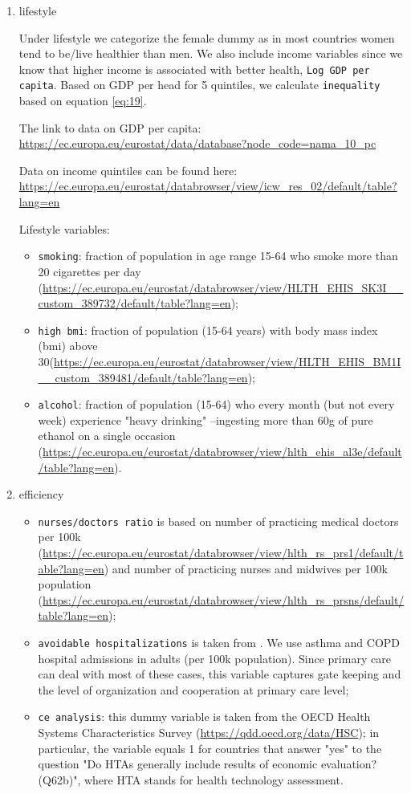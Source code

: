 \documentclass[12pt,english,a4paper]{article}
\begin{document}
\begin{enumerate}
\item lifestyle
\label{sec:orgd122edc}

Under lifestyle we categorize the female dummy as in most countries women tend to be/live healthier than men. We also include income variables since we know that higher income is associated with better health, \texttt{Log GDP per capita}. Based on GDP per head for 5 quintiles, we calculate \texttt{inequality} based on equation \eqref{eq:19}.

The link to data on GDP per capita:
\url{https://ec.europa.eu/eurostat/data/database?node\_code=nama\_10\_pc}

Data on income quintiles can be found here:
\url{https://ec.europa.eu/eurostat/databrowser/view/icw\_res\_02/default/table?lang=en}

Lifestyle variables:
\begin{itemize}
\item \texttt{smoking}: fraction of population in age range 15-64 who smoke more than 20 cigarettes per day (\url{https://ec.europa.eu/eurostat/databrowser/view/HLTH\_EHIS\_SK3I\_\_custom\_389732/default/table?lang=en});
\item \texttt{high bmi}: fraction of population (15-64 years) with body mass index (bmi) above 30(\url{https://ec.europa.eu/eurostat/databrowser/view/HLTH\_EHIS\_BM1I\_\_custom\_389481/default/table?lang=en});
\item \texttt{alcohol}: fraction of population (15-64) who every month (but not every week) experience "heavy drinking" --ingesting more than 60g of pure ethanol on a single occasion (\url{https://ec.europa.eu/eurostat/databrowser/view/hlth\_ehis\_al3e/default/table?lang=en}).
\end{itemize}

\item efficiency
\label{sec:orgfd18d83}

\begin{itemize}
\item \texttt{nurses/doctors ratio} is based on number of practicing medical doctors per 100k (\url{https://ec.europa.eu/eurostat/databrowser/view/hlth\_rs\_prs1/default/table?lang=en}) and number of practicing nurses and midwives per 100k population (\url{https://ec.europa.eu/eurostat/databrowser/view/hlth\_rs\_prsns/default/table?lang=en});
\item \texttt{avoidable hospitalizations} is taken from \cite{oecdHospitalAdmissions}. We use asthma and COPD hospital admissions in adults (per 100k population). Since primary care can deal with most of these cases, this variable captures gate keeping and the level of organization and cooperation at primary care level;
\item \texttt{ce analysis}: this dummy variable is taken from the OECD Health Systems Characteristics Survey (\url{https://qdd.oecd.org/data/HSC});  in particular, the variable equals 1 for countries that answer "yes" to the question "Do HTAs generally include results of economic evaluation? (Q62b)", where HTA stands for health technology assessment.
\end{itemize}


\end{enumerate}
\end{document}

